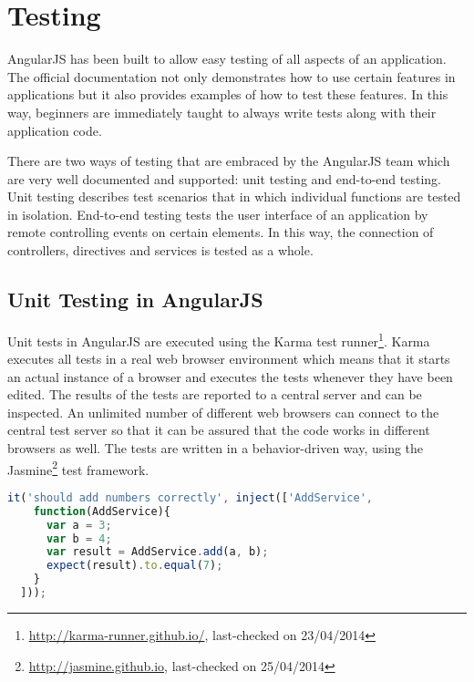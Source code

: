 \section{Testing}

AngularJS has been built to allow easy testing of all aspects of an application. The official documentation not only demonstrates how to use certain features in applications but it also provides examples of how to test these features. In this way, beginners are immediately taught to always write tests along with their application code. 

There are two ways of testing that are embraced by the AngularJS team which are very well documented and supported: unit testing and end-to-end testing. Unit testing describes test scenarios that in which individual functions are tested in isolation. End-to-end testing tests the user interface of an application by remote controlling events on certain elements. In this way, the connection of controllers, directives and services is tested as a whole. \cite[chapter: Two types of tests in AngularJS (plus one more)]{niemla2013testing}

\subsection{Unit Testing in AngularJS}

Unit tests in AngularJS are executed using the Karma test runner\footnote{\url{http://karma-runner.github.io/}, last-checked on 23/04/2014}. Karma executes all tests in a real web browser environment which means that it starts an actual instance of a browser and executes the tests whenever they have been edited. The results of the tests are reported to a central server and can be inspected. An unlimited number of different web browsers can connect to the central test server so that it can be assured that the code works in different browsers as well.
The tests are written in a behavior-driven way, using the Jasmine\footnote{\url{http://jasmine.github.io}, last-checked on 25/04/2014} test framework.

\begin{lstlisting}[language=JavaScript, caption=Testing a service, label=lst:testing-service]
  it('should add numbers correctly', inject(['AddService',
    function(AddService){
      var a = 3;
      var b = 4;
      var result = AddService.add(a, b);
      expect(result).to.equal(7);
    }
  ]));
\end{lstlisting}

